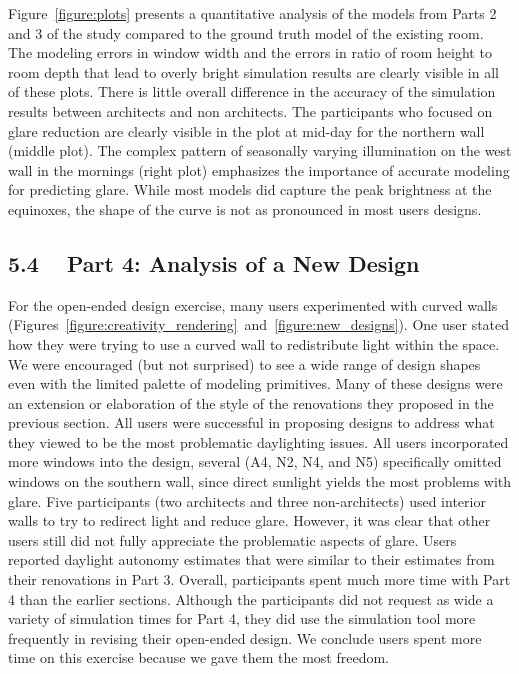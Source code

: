 \documentclass{article}
\begin{document}
Figure~\ref{figure:plots} presents a quantitative analysis of the
models from Parts 2 and 3 of the study compared to the ground truth
model of the existing room.  The modeling errors in window width and
the errors in ratio of room height to room depth
that lead to overly bright simulation results are clearly visible in
all of these plots.  There is little overall difference in the
accuracy of the simulation results between architects and non
architects.  The participants who focused on glare reduction are
clearly visible in the plot at mid-day for the northern wall (middle
plot).  The complex pattern of seasonally varying illumination on the
west wall in the mornings (right plot) emphasizes the importance of
accurate modeling for predicting glare.  While most models did capture
the peak brightness at the equinoxes, the shape of the curve is not as
pronounced in most users designs.

\subsection{5.4 ~ Part 4: Analysis of a New Design} 

For the open-ended design exercise, many users experimented with
curved walls
(Figures~\ref{figure:creativity_rendering}~and~\ref{figure:new_designs}).
One user stated how they were trying to use a curved wall to
redistribute light within the space.  We were encouraged (but not
surprised) to see a wide range of design shapes even with the limited
palette of modeling primitives.  Many of these designs were an
extension or elaboration of the style of the renovations they proposed
in the previous section.
%
All users were successful in proposing designs to address what they
viewed to be the most problematic daylighting issues. All users
incorporated more windows into the design, several (A4, N2, N4, and
N5) specifically omitted windows on the southern wall, since direct
sunlight yields the most problems with glare.  Five participants (two
architects and three non-architects) used interior walls to try to
redirect light and reduce glare.  However, it was clear that other
users still did not fully appreciate the problematic aspects of glare.
Users reported daylight autonomy estimates that were similar to their
estimates from their renovations in Part 3.
%
Overall, participants spent much more time with Part 4 than the
earlier sections.  Although the participants did not request as wide a
variety of simulation times for Part 4, they did use the simulation
tool more frequently in revising their open-ended design.  We conclude
users spent more time on this exercise because we gave them the most
freedom.
\end{document}

